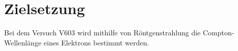 \section{Zielsetzung} 

\begin{flushleft}
    Bei dem Versuch V603 wird mithilfe von Röntgenstrahlung die Compton-Wellenlänge eines Elektrons bestimmt werden.
\end{flushleft}


